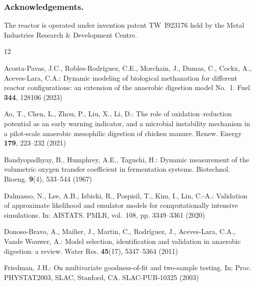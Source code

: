 \documentclass[runningheads]{llncs}
\begin{document}
\subsubsection{Acknowledgements.} The reactor is operated under
invention patent TW~I923176 held by the Metal Industries Research \&
Development Centre.


\begin{thebibliography}{12}

Acosta-Pavas, J.C., Robles-Rodr\'{i}guez, C.E., Morchain, J., Dumas, C.,
Cockx, A., Aceves-Lara, C.A.: Dynamic modeling of biological methanation
for different reactor configurations: an extension of the anaerobic
digestion model No.~1. Fuel \textbf{344}, 128106 (2023)

Ao, T., Chen, L., Zhou, P., Liu, X., Li, D.: The role of
oxidation--reduction potential as an early warning indicator, and a
microbial instability mechanism in a pilot-scale anaerobic mesophilic
digestion of chicken manure. Renew. Energy \textbf{179}, 223--232 (2021)

Bandyopadhyay, B., Humphrey, A.E., Taguchi, H.: Dynamic measurement of
the volumetric oxygen transfer coefficient in fermentation systems.
Biotechnol. Bioeng. \textbf{9}(4), 533--544 (1967)

Dalmasso, N., Lee, A.B., Izbicki, R., Pospisil, T., Kim, I., Lin,
C.-A.: Validation of approximate likelihood and emulator models for
computationally intensive simulations. In: AISTATS. PMLR, vol.~108,
pp. 3349--3361 (2020)

Donoso-Bravo, A., Mailier, J., Martin, C., Rodr\'{i}guez, J.,
Aceves-Lara, C.A., Vande Wouwer, A.: Model selection, identification
and validation in anaerobic digestion: a review. Water Res.
\textbf{45}(17), 5347--5364 (2011)

Friedman, J.H.: On multivariate goodness-of-fit and two-sample testing.
In: Proc. PHYSTAT2003, SLAC, Stanford, CA. SLAC-PUB-10325 (2003)


\end{thebibliography}
\end{document}

